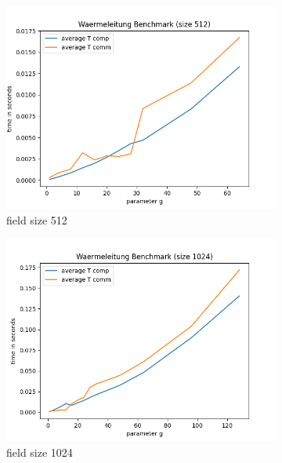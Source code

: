 \documentclass[12pt]{article}
\begin{document}
\begin{figure}[!htb]
\begin{subfigure}{0.5\textwidth}
        \centering
        \includegraphics[scale=0.5]{../benchmark/plots/plot_avg_512.png}
        \caption{field size 512}\label{fig:plot_512_avg}
    \end{subfigure}
	\begin{subfigure}{0.5\textwidth}
        \centering
        \includegraphics[scale=0.5]{../benchmark/plots/plot_avg_1024.png}
        \caption{field size 1024}\label{fig:plot_1024_avg}
    \end{subfigure}
    \begin{center}
        \begin{subfigure}{0.5\textwidth}
            \centering

\end{subfigure}
\end{center}
\end{figure}
\end{document}
